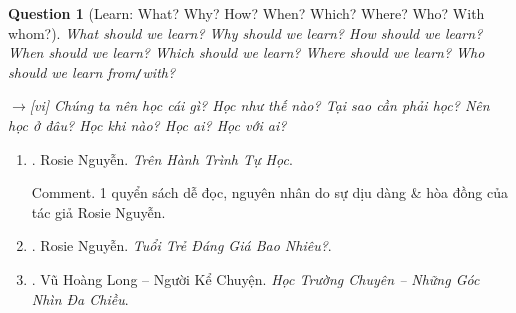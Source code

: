 \documentclass[12pt,oneside]{book}
\newtheorem{question}{Question}
\begin{document}
\begin{question}[Learn: What? Why? How? When? Which? Where? Who? With whom?]
	What should we learn? Why should we learn? How should we learn? When should we learn? Which should we learn? Where should we learn? Who should we learn from{\tt/}with?
	
	{\sf[en]$\to$[vi]} Chúng ta nên học cái gì? Học như thế nào? Tại sao cần phải học? Nên học ở đâu? Học khi nào? Học ai? Học với ai?
\end{question}
\begin{enumerate}
	\item \cite{Rosie_self_study}. {\sc Rosie Nguyễn}. {\it Trên Hành Trình Tự Học}.
	
	{\sf Comment.} 1 quyển sách dễ đọc, nguyên nhân do sự dịu dàng \& hòa đồng của tác giả {\sc Rosie Nguyễn}.
	\item \cite{Rosie_youth}. {\sc Rosie Nguyễn}. {\it Tuổi Trẻ Đáng Giá Bao Nhiêu?}.
	\item \cite{Long2021}. {\sc Vũ Hoàng Long -- Người Kể Chuyện}. {\it Học Trường Chuyên -- Những Góc Nhìn Đa Chiều}.
	

\end{enumerate}
\end{document}
